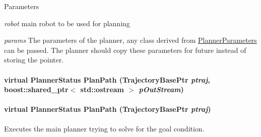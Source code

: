 \begin{DoxyParams}{Parameters}
\item[{\em robot}]main robot to be used for planning \item[{\em params}]The parameters of the planner, any class derived from \hyperlink{classOpenRAVE_1_1PlannerBase_1_1PlannerParameters}{PlannerParameters} can be passed. The planner should copy these parameters for future instead of storing the pointer. \end{DoxyParams}
\hypertarget{classOpenRAVE_1_1PlannerBase_a9ec338cf4116a2bf8b874cde2aa28967}{
\paragraph[{PlanPath}]{\setlength{\rightskip}{0pt plus 5cm}virtual {\bf PlannerStatus} PlanPath (TrajectoryBasePtr {\em ptraj}, \/  boost::shared\_\-ptr$<$ std::ostream $>$ {\em pOutStream})}\hfill}
\label{classOpenRAVE_1_1PlannerBase_a9ec338cf4116a2bf8b874cde2aa28967}
\hypertarget{classOpenRAVE_1_1PlannerBase_a7ce22311b1f81ec6b9bacdf457d4631a}{
\paragraph[{PlanPath}]{\setlength{\rightskip}{0pt plus 5cm}virtual {\bf PlannerStatus} PlanPath (TrajectoryBasePtr {\em ptraj})}\hfill}
\label{classOpenRAVE_1_1PlannerBase_a7ce22311b1f81ec6b9bacdf457d4631a}


Executes the main planner trying to solve for the goal condition. 

